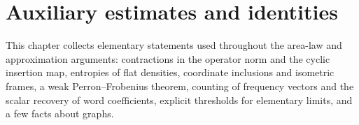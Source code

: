 \chapter{Auxiliary estimates and identities}
\label{ch:auxiliary_estimates}

This chapter collects elementary statements used throughout the area-law and
approximation arguments: contractions in the operator norm and the cyclic
insertion map, entropies of flat densities, coordinate inclusions and isometric
frames, a weak Perron--Frobenius theorem, counting of frequency vectors and the
scalar recovery of word coefficients, explicit thresholds for elementary limits,
and a few facts about graphs.






